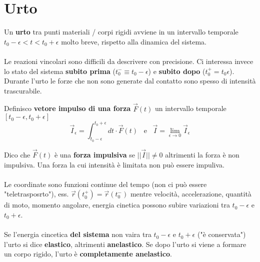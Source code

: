 \newpage
\section{Urto}
Un \textbf{urto} tra punti materiali / corpi rigidi avviene in un intervallo temporale 
$t_0 - \epsilon < t < t_0 + \epsilon$ molto breve, rispetto alla dinamica del sistema.\\\\
Le reazioni vincolari sono difficili da descrivere con precisione. Ci interessa invece lo stato del sistema \textbf{subito prima}
($t_0^- \equiv t_0 - \epsilon$) e \textbf{subito dopo} ($t_0^+ = t_0 \epsilon$). 
Durante l'urto le forze che non sono generate dal contatto sono spesso di intensità trascurabile.
\begin{definition}
    Definisco \textbf{vetore impulso di una forza} $\vec{F}(t)$ un intervallo temporale $[t_0 - \epsilon, t_0 + \epsilon]$
    $$\vec{I}_{\epsilon} = \int_{t_0 - \epsilon}^{t_0 + \epsilon}dt \cdot \vec{F}(t) \hspace{10pt} \text{e} \hspace{10pt}\vec{I} = \lim_{\epsilon\to 0}\vec{I}_{\epsilon}$$
\end{definition}
Dico che $\vec{F}(t)$ è una \textbf{forza impulsiva} se $||\vec{I}|| \neq 0$ altrimenti la forza è non impulsiva.
Una forza la cui intensità è limitata non può essere impuliva.\\\\
Le coordinate sono funzioni continue del tempo (non ci può essere "teletrasposrto"), ess. $\vec{r}(t_0^+) = \vec{r}(t_0^-)$ mentre
velocità, accelerazione, quantità di moto, momento angolare, energia cinetica possono subire variazioni tra $t_0 - \epsilon$ e $t_0 + \epsilon$.\\\\
Se l'energia cincetica \textbf{del sistema} non vaira tra $t_0 - \epsilon$ e $t_0 + \epsilon$ ("è conservata") l'urto si dice \textbf{elastico}, altrimenti \textbf{anelastico}.
Se dopo l'urto si viene a formare un corpo rigido, l'urto è \textbf{completamente anelastico}.

